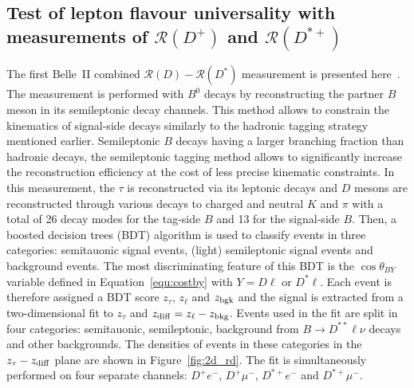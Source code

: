 \documentclass{moriond}
\def\costby{\cos\theta_{BY}}
\def\zdiff{z_{\rm diff}}
\def\rd{\mathcal{R}\left(D\right)}
\def\rdp{\mathcal{R}\left(D^+\right)}
\def\rdst{\mathcal{R}\left(D^*\right)}
\def\rdstp{\mathcal{R}\left(D^{*+}\right)}
\begin{document}
\subsection{Test of lepton flavour universality with measurements of $\rdp$ and $\rdstp$}
The first Belle~II combined $\rd-\rdst$ measurement is presented here~\cite{alina}. The measurement is performed with $B^0$ decays by reconstructing the partner $B$ meson in its semileptonic decay channels. This method allows to constrain the kinematics of signal-side decays similarly to the hadronic tagging strategy mentioned earlier. Semileptonic $B$ decays having a larger branching fraction than hadronic decays, the semileptonic tagging method allows to significantly increase the reconstruction efficiency at the cost of less precise kinematic constraints. In this measurement, the $\tau$ is reconstructed via its leptonic decays and $D$ mesons are reconstructed through various decays to charged and neutral $K$ and $\pi$ with a total of 26 decay modes for the tag-side $B$ and 13 for the signal-side $B$. Then, a boosted decision trees (BDT) algorithm is used to classify events in three categories: semitauonic signal events, (light) semileptonic signal events and background events. The most discriminating feature of this BDT is the $\costby$ variable defined in Equation~\ref{equ:costby} with $Y=D\ell$ or $D^*\ell$. Each event is therefore assigned a BDT score $z_\tau$, $z_\ell$ and $z_{\rm bgk}$ and the signal is extracted from a two-dimensional fit to $z_\tau$ and $\zdiff = z_\ell - z_{\rm bkg}$. Events used in the fit are split in four categories: semitauonic, semileptonic, background from $B \to D^{**}\ell\nu$ decays and other backgrounds. The densities of events in these categories in the $z_\tau-\zdiff$ plane are shown in Figure~\ref{fig:2d_rd}. The fit is simultaneously performed on four separate channels: $D^+e^-$, $D^+\mu^-$, $D^{*+}e^-$ and  $D^{*+}\mu^-$.
\end{document}

